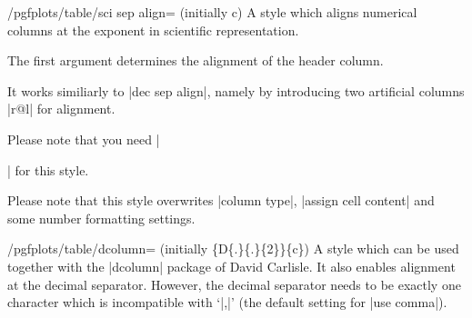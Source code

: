 % 
 
% 
% 
% 

\begin{stylekey}{/pgfplots/table/sci sep align= (initially c)}
	A style which aligns numerical columns at the exponent in scientific representation.

	The first argument determines the alignment of the header column. 

	It works similiarly to |dec sep align|, namely by introducing two artificial columns |r@{}l| for alignment.
	
	Please note that you need |\usepackage{array}| for this style.

	Please note that this style overwrites |column type|, |assign cell content| and some number formatting settings.
\end{stylekey}

\begin{stylekey}{/pgfplots/table/dcolumn= (initially \{D\{.\}\{.\}\{2\}\}\{c\})}
	A style which can be used together with the |dcolumn| package of David Carlisle. It also enables alignment at the decimal separator. However, the decimal separator needs to be exactly one character which is incompatible with `|{,}|' (the default setting for |use comma|).
\end{stylekey}

